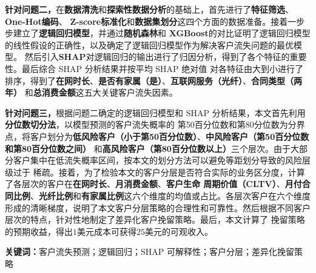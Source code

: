 \documentclass[12pt,a4paper]{ctexart}
\begin{document}
\textbf{针对问题二，}在\textbf{数据清洗}和\textbf{探索性数据分析}的基础上，首先进行了\textbf{特征筛选}、\textbf{One-Hot编码}、
\textbf{Z-score标准化}和\textbf{数据集划分}这四个方面的数据准备。接着一步步建立了\textbf{逻辑回归模型}，并通过\textbf{随机森林}和
\textbf{XGBoost}的对比证明了逻辑回归模型的线性假设的正确性，以及确定了逻辑回归模型作为解决客户流失问题的最优模型。
然后引入\textbf{SHAP}对逻辑回归的输出进行了归因分析，得到了各个特征的重要性。最后综合 SHAP 分析结果并按平均 SHAP 绝对值
对各特征由大到小进行了排序，得到了\textbf{在网时长}、\textbf{是否有家属（是）}、\textbf{互联网服务（光纤）}、\textbf{合同类型（两年）}
和\textbf{总消费金额}这五大关键客户流失因素。

\textbf{针对问题三，}根据问题二确定的逻辑回归模型和 SHAP 分析结果，本文首先利用\textbf{分位数切分法}，以模型预测的客户流失概率的
第50百分位数和第80分位数为分界点，将客户划分为\textbf{低风险客户（小于第50百分位数）}、\textbf{中风险客户（第50百分位数和第80百分位数之间）}
和\textbf{高风险客户（第80百分位数以上）}三个层次。由于大部分客户集中在低流失概率区间，按本文的划分方法可以避免等距划分导致的风险层级过于
稀疏。接着，为了检验本文的客户分层是否符合实际的业务区分度，计算了各层次的客户在\textbf{在网时长}、\textbf{月消费金额}、\textbf{客户生命
周期价值（CLTV）}、\textbf{月付合同比例}、\textbf{光纤比例}和\textbf{有家属比例}这六个维度的均值或占比。各层次客户在六个维度
形成的清晰梯度，说明了本文客户分层策略的合理性和可靠性。然后根据不同客户层次的特点，针对性地制定了差异化客户挽留策略。最后，本文计算了
挽留策略的预期收益，得出$1$美元成本可获得$25$美元的可观收入。




\vspace{1em}

\textbf{关键词：}客户流失预测；逻辑回归；SHAP 可解释性；客户分层；差异化挽留策略

\newpage

\newpage










\newpage



\appendix



\end{document}
